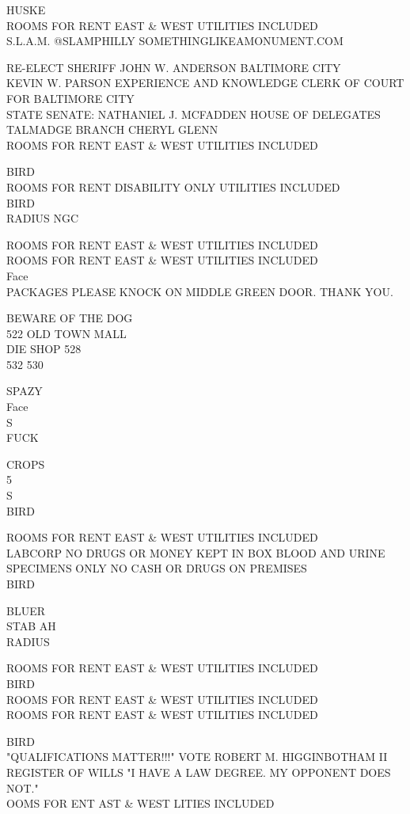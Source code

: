 \documentclass[10pt,letterpaper]{article}
\begin{document}
HUSKE\\
ROOMS FOR RENT EAST \& WEST UTILITIES INCLUDED\\
S.L.A.M. @SLAMPHILLY SOMETHINGLIKEAMONUMENT.COM

RE{-}ELECT SHERIFF JOHN W. ANDERSON BALTIMORE CITY\\
KEVIN W. PARSON EXPERIENCE AND KNOWLEDGE CLERK OF COURT FOR BALTIMORE CITY\\
STATE SENATE: NATHANIEL J. MCFADDEN HOUSE OF DELEGATES TALMADGE BRANCH CHERYL GLENN\\
ROOMS FOR RENT EAST \& WEST UTILITIES INCLUDED

BIRD\\
ROOMS FOR RENT DISABILITY ONLY UTILITIES INCLUDED\\
BIRD\\
RADIUS NGC

ROOMS FOR RENT EAST \& WEST UTILITIES INCLUDED\\
ROOMS FOR RENT EAST \& WEST UTILITIES INCLUDED\\
Face\\
PACKAGES PLEASE KNOCK ON MIDDLE GREEN DOOR.  THANK YOU.

BEWARE OF THE DOG\\
522 OLD TOWN MALL\\
DIE SHOP 528\\
532 530

SPAZY\\
Face\\
S\\
FUCK

CROPS\\
5\\
S\\
BIRD

ROOMS FOR RENT EAST \& WEST UTILITIES INCLUDED\\
LABCORP NO DRUGS OR MONEY KEPT IN BOX BLOOD AND URINE SPECIMENS ONLY NO CASH OR DRUGS ON PREMISES\\
BIRD

BLUER\\
STAB AH\\
RADIUS

ROOMS FOR RENT EAST \& WEST UTILITIES INCLUDED\\
BIRD\\
ROOMS FOR RENT EAST \& WEST UTILITIES INCLUDED\\
ROOMS FOR RENT EAST \& WEST UTILITIES INCLUDED

BIRD\\
"QUALIFICATIONS MATTER!!!" VOTE ROBERT M. HIGGINBOTHAM II REGISTER OF WILLS "I HAVE A LAW DEGREE.  MY OPPONENT DOES NOT."\\
OOMS FOR ENT AST \& WEST LITIES INCLUDED
\end{document}
